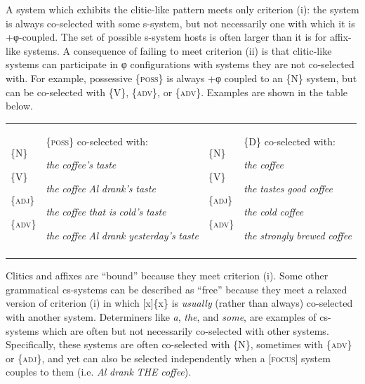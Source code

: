   A system which exhibits the clitic-like pattern meets only criterion (i): the system is always co-selected with some s-system, but not necessarily one with which it is +φ-coupled. The set of possible s-system hosts is often larger than it is for affix-like systems. A consequence of failing to meet criterion (ii) is that clitic-like systems can participate in φ configurations with systems they are not co-selected with. For example, possessive \{\textsc{poss}\} is always +φ coupled to an \{N\} system, but can be co-selected with \{V\}, \{\textsc{adv}\}, or \{\textsc{adv}\}. Examples are shown in the table below.

\begin{tabularx}{\textwidth}{XXXX}
\lsptoprule
\raggedleft \{N\} \par

\raggedleft \{V\}\par

\raggedleft \{\textsc{adj}\}\par

\raggedleft \{\textsc{adv}\} & \{\textsc{poss}\} co-selected with:

\textit{the} \textit{coffee’s} \textit{taste} 

\textit{the} \textit{coffee} \textit{Al} \textit{drank’s} \textit{taste}

\textit{the} \textit{coffee} \textit{that} \textit{is} \textit{cold’s} \textit{taste}

\textit{the} \textit{coffee} \textit{Al} \textit{drank} \textit{yesterday’s} \textit{taste} & \raggedleft \{N\}\par

\raggedleft \{V\}\par

\raggedleft \{\textsc{adj}\}\par

\raggedleft \{\textsc{adv}\} & \{\textsc{D}\} co-selected with:

\textit{the} \textit{coffee}

\textit{the} \textit{tastes} \textit{good} \textit{coffee}

\textit{the} \textit{cold} \textit{coffee}

\textit{the} \textit{strongly} \textit{brewed} \textit{coffee}\\
\lspbottomrule
\end{tabularx}
  Clitics and affixes are “bound” because they meet criterion (i). Some other grammatical cs-systems can be described as “free” because they meet a relaxed version of criterion (i) in which [x]\{x\} is \textit{usually} (rather than always) co-selected with another system. Determiners like \textit{a}, \textit{the}, and \textit{some}, are examples of cs-systems which are often but not necessarily co-selected with other systems. Specifically, these systems are often co-selected with \{N\}, sometimes with \{\textsc{adv}\} or \{\textsc{adj}\}, and yet can also be selected independently when a [\textsc{focus}] system couples to them (i.e. \textit{Al} \textit{drank} \textit{THE} \textit{coffee}).

